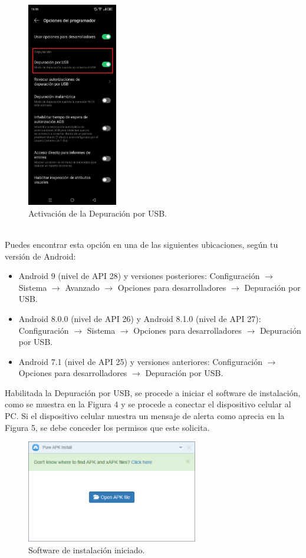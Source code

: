 \documentclass[a4paper,10pt, oneside, titlepage]{article}
\begin{document}
	\begin{figure}[!h]
		\centering
		\includegraphics[width = 0.45\linewidth, height = 9cm]{3.jpeg}
		\caption{Activación de la Depuración por USB.}
	\end{figure}\\
	Puedes encontrar esta opción en una de las siguientes ubicaciones, según tu versión de Android:
	\begin{itemize}
		\item Android 9 (nivel de API 28) y versiones posteriores: Configuración $\rightarrow$ Sistema $\rightarrow$ Avanzado $\rightarrow$ Opciones para desarrolladores $\rightarrow$ Depuración por USB.
		\item Android 8.0.0 (nivel de API 26) y Android 8.1.0 (nivel de API 27): Configuración $\rightarrow$ Sistema $\rightarrow$ Opciones para desarrolladores $\rightarrow$ Depuración por USB.
		\item Android 7.1 (nivel de API 25) y versiones anteriores: Configuración $\rightarrow$ Opciones para desarrolladores $\rightarrow$ Depuración por USB.
	\end{itemize}
	Habilitada la Depuración por USB, se procede a iniciar el software de instalación, como se muestra en la Figura 4 y se procede a conectar el dispositivo celular al PC. Si el dispositivo celular muestra un mensaje de alerta como aprecia en la Figura 5, se debe conceder los permisos que este solicita.
	\begin{figure}[!h]
		\centering
		\includegraphics[width = 0.7\linewidth, height = 4.5cm]{4.png}
		\caption{Software de instalación iniciado.}
	\end{figure}
\end{document}
